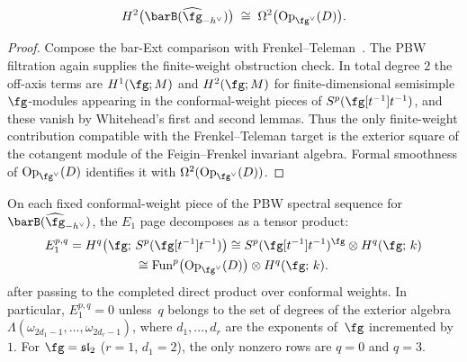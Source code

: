 \begin{proposition}
\label{prop:oper-bar-h2-dl}
\begin{equation}\label{eq:h2-oper}
H^2\bigl(\barB(\widehat{\fg}_{-h^\vee})\bigr)
\;\cong\;
\Omega^2\bigl(\mathrm{Op}_{\fg^\vee}(D)\bigr).
\end{equation}
\end{proposition}

\begin{proof}
Compose the bar-Ext comparison with Frenkel--Teleman~\cite{FT06}.
The PBW filtration again supplies the finite-weight obstruction
check. In total degree $2$ the off-axis terms are
$H^1(\fg;M)$ and $H^2(\fg;M)$ for finite-dimensional semisimple
$\fg$-modules appearing in the conformal-weight pieces of
$S^p(\fg[t^{-1}]t^{-1})$, and these vanish by Whitehead's first and
second lemmas. Thus the only finite-weight contribution compatible
with the Frenkel--Teleman target is the exterior square of the
cotangent module of the Feigin--Frenkel invariant algebra. Formal
smoothness of $\mathrm{Op}_{\fg^\vee}(D)$ identifies it with
$\Omega^2(\mathrm{Op}_{\fg^\vee}(D))$.
\end{proof}

\begin{proposition}
\label{prop:whitehead-spectral-decomposition}
On each fixed conformal-weight piece of the PBW spectral sequence
for~$\barB(\widehat{\fg}_{-h^\vee})$, the $E_1$ page decomposes as
a tensor product:
\begin{multline}\label{eq:whitehead-spectral-decomposition}
E_1^{p,q}
= H^q\bigl(\fg;\, S^p(\fg[t^{-1}]t^{-1})\bigr)
\cong
S^p(\fg[t^{-1}]t^{-1})^{\fg}
\otimes
H^q(\fg;\, k)\\
\cong
\mathrm{Fun}^p\bigl(\mathrm{Op}_{\fg^\vee}(D)\bigr)
\otimes H^q(\fg;\, k).
\end{multline}
after passing to the completed direct product over conformal
weights. In particular, $E_1^{p,q} = 0$ unless~$q$ belongs to the
set of degrees of the exterior algebra
$\Lambda(\omega_{2d_1-1},\allowbreak \ldots,\allowbreak \omega_{2d_r-1})$,
where $d_1, \ldots, d_r$ are the exponents of~$\fg$
incremented by~$1$. For
$\fg = \mathfrak{sl}_2$ ($r = 1$, $d_1 = 2$),
the only nonzero rows are $q = 0$ and $q = 3$.
\end{proposition}

